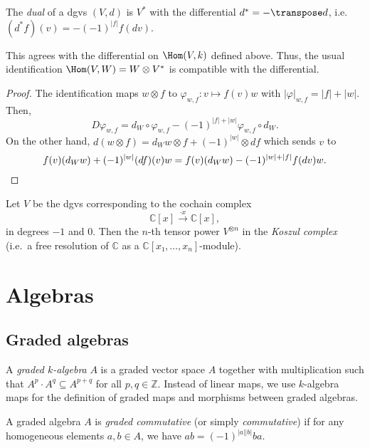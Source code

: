 \documentclass[english,no-theorem-numbers]{short-notes}
\newcommand\degree[1]{|#1|}
\renewcommand\dual{*}
\begin{document}
\begin{Def}[Dual]
The \emph{dual} of a dgvs $(V,d)$ is $V^\dual$ with the differential $d^\dual = - \transpose d$, i.e.\ $(d^\dual f)(v) = - (-1)^{\degree f} f(dv)$.
\end{Def}

\begin{Prop}
    This agrees with the differential on $\Hom(V,k)$ defined above.
    Thus, the usual identification $\Hom(V,W) = W \otimes V^\dual$ is compatible with the differential.
\end{Prop}
\begin{proof}
    The identification maps $w \otimes f$ to $φ_{w,f}\colon v \mapsto f(v)w$ with $\degree φ_{w,f} = \degree f + \degree w$.
    Then,
    \[
    Dφ_{w,f} = d_W ∘ φ_{w,f} - (-1)^{\degree f + \degree w} φ_{w,f} ∘ d_W.
    \]
    On the other hand, $d(w \otimes f) = d_Ww \otimes f + (-1)^{\degree w} \otimes df$ which sends $v$ to
    \[
    f(v)(d_Ww) + (-1)^{\degree w}(df)(v)w =
    f(v)(d_Ww) - (-1)^{\degree w + \degree f}f(dv)w.
    \qedhere
    \]%
\end{proof}%

\begin{Ex}
    Let $V$ be the dgvs corresponding to the cochain complex
    \[
    ℂ[x] \xrightarrow{\cdot x} ℂ[x],
    \]
    in degrees $-1$ and $0$.
    Then the $n$-th tensor power $V^{\otimes n}$ in the \emph{Koszul complex} (i.e.\ a free resolution of $ℂ$ as a $ℂ[x₁,\dotsc,x_n]$-module).
\end{Ex}

\section{Algebras}

\subsection{Graded algebras}

\begin{Def}
    A \emph{graded $k$-algebra} $A$ is a graded vector space $A$ together with multiplication such that $A^p\cdot A^q ⊆ A^{p+q}$ for all $p,q ∈ ℤ$.
    Instead of linear maps, we use $k$-algebra maps for the definition of graded maps and morphisms between graded algebras.
\end{Def}

\begin{Def}[Commutativity]
A graded algebra $A$ is \emph{graded commutative} (or simply \emph{commutative}) if for any homogeneous elements $a,b ∈ A$, we have $ab = (-1)^{\degree a \degree b}ba$.
\end{Def}
\end{document}
